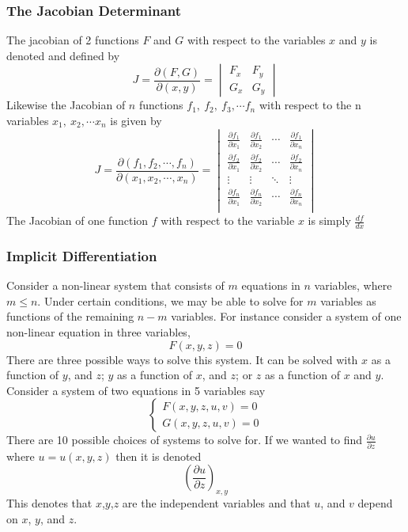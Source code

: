 \documentclass[14pt]{article}
\begin{document}
    \subsubsection{The Jacobian Determinant}
    The jacobian of 2 functions $F$ and $G$ with respect to the
    variables $x$ and $y$ is denoted and defined by
    $$J=\frac{\partial(F, G)}{\partial(x, y)}=\begin{vmatrix} F_x& F_y\\
        G_x& G_y \end{vmatrix}$$ Likewise the Jacobian of $n$ functions
    $f_1,\ f_2,\ f_3,\cdots f_n$ with respect to the n variables $x_1,\
    x_2,\cdots x_n$ is given by
    $$J=\frac{\partial(f_1, f_2,\cdots, f_n)}{\partial(x_1, x_2,\cdots,
        x_n)}=\begin{vmatrix} \frac{\partial f_1}{\partial x_1} &
        \frac{\partial f_1}{\partial x_2} & \cdots& \frac{\partial
        f_1}{\partial x_n}\\
        \frac{\partial f_2}{\partial x_1}&\frac{\partial f_2}{\partial
        x_2} & \cdots& \frac{\partial f_2}{\partial x_n}\\
        \vdots& \vdots&\ddots & \vdots\\
        \frac{\partial f_n}{\partial x_1}& \frac{\partial f_n}{\partial
        x_2}& \cdots&\frac{\partial f_n}{\partial x_n} \\
    \end{vmatrix}$$ The Jacobian of one function $f$ with respect to the
    variable $x$ is simply $\frac{df}{dx}$
    \subsubsection{Implicit Differentiation}
    Consider a non-linear system that consists of $m$ equations in $n$
    variables, where $m\leq n$. Under certain conditions, we may be able
    to solve for $m$ variables as functions of the remaining $n-m$
    variables. For instance consider a system of one non-linear equation
    in three variables,
    $$F(x,y,z)=0$$ There are three possible ways to solve this system.
    It can be solved with $x$ as a function of $y$, and $z$; $y$ as a
    function of $x$, and $z$; or $z$ as a function of $x$ and $y$.
    Consider a system of two equations in 5 variables say 
    $$\left\{\begin{array}{lr} F(x,y,z,u,v)=0\\
        G(x,y,z,u,v)=0 \end{array}\right.$$ There are 10 possible
    choices of systems to solve for. If we wanted to find
    $\frac{\partial u}{\partial z}$ where $u=u(x,y,z)$ then it is
    denoted
    $$\left(\frac{\partial u}{\partial z}\right)_{x,y}$$ This denotes
    that $x$,$y$,$z$ are the independent variables and that $u$, and $v$
    depend on $x$, $y$, and $z$.
\end{document}
